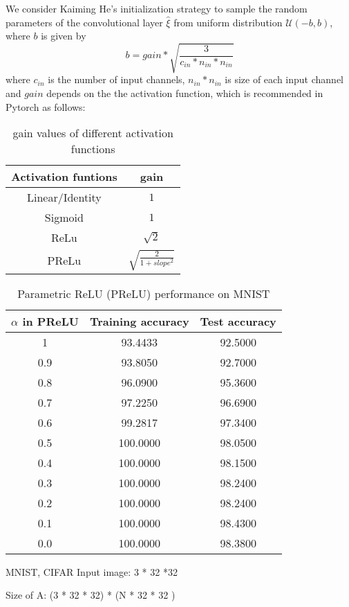 We consider Kaiming He's initialization\cite{he2015delving} strategy to sample the random parameters of the convolutional layer $\hat{\xi}$ from uniform distribution $\mathcal{U}(-b,b)$, where $b$ is given by
\begin{equation}
	b = gain * \sqrt{\frac{3}{c_{in}*n_{in}*n_{in}}}
\end{equation}
where $c_{in}$ is the number of input channels, $n_{in}*n_{in}$ is size of each input channel and $gain$ depends on the the activation function, which is recommended in Pytorch as follows:
\begin{table}[H]
	\caption{gain values of different activation functions}
	\label{gain}
	\begin{center}
			\begin{tabular}{|c|c|}
				\hline
				Activation funtions & gain
				\tabularnewline \hline
				Linear/Identity & $1$
				\tabularnewline \hline
				Sigmoid   & $1$				 
				\tabularnewline \hline
				ReLu   & $\sqrt{2}	$	
				\tabularnewline \hline
				PReLu   & $\sqrt{\frac{2}{1+slope^2}}	$
				\tabularnewline \hline			 
			\end{tabular} 
	\end{center}
\end{table}

\begin{table}[H]
	\caption{Parametric ReLU (PReLU) performance on MNIST}
	\begin{center}
		\begin{tabular}{|c|c|c|}
			\hline
			$\alpha$ in PReLU & Training accuracy & Test accuracy
			\tabularnewline \hline
			1     & 93.4433  & 92.5000
			\tabularnewline \hline
			0.9   & 93.8050  & 92.7000				 
			\tabularnewline \hline
			0.8   & 96.0900	 & 95.3600
			\tabularnewline \hline
			0.7   & 97.2250  & 96.6900
			\tabularnewline \hline	
			0.6   & 99.2817  & 97.3400
			\tabularnewline \hline	
			0.5   & 100.0000 & 98.0500
			\tabularnewline \hline
			0.4   & 100.0000 & 98.1500
			\tabularnewline \hline	
			0.3   & 100.0000 & 98.2400
			\tabularnewline \hline	
			0.2   & 100.0000 & 98.2400
			\tabularnewline \hline	
			0.1   & 100.0000 & 98.4300
			\tabularnewline \hline	
			0.0   & 100.0000 & 98.3800
			\tabularnewline \hline		 
		\end{tabular} 
	\end{center}
\end{table}

MNIST, CIFAR
Input image: 3 * 32 *32 

Size of A: (3 * 32 * 32) * (N * 32 * 32 )

